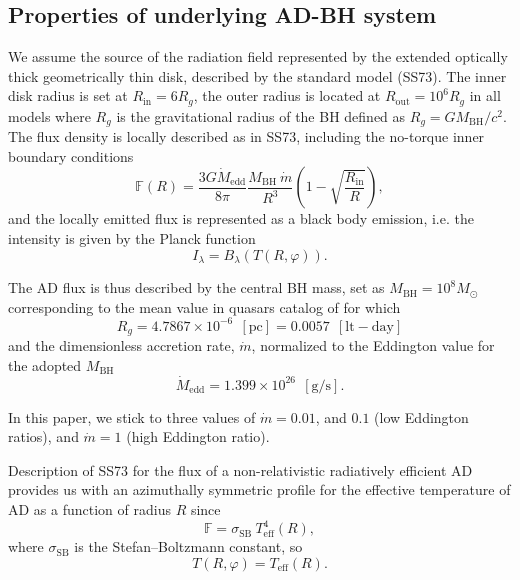 \documentclass[twocolumn]{aastex62}
\begin{document}
\subsection{Properties of underlying AD-BH system } \label{sec:diskproperties}

We assume the source of the radiation field represented by the extended optically thick geometrically thin disk, described by the \citet{SS1973} standard model (SS73). The inner disk radius is set at $R_{\mathrm{in}} = 6 R_{g}$, the outer radius is located at $R_{\mathrm{out}} = 10^6 R_{g}$ in all models where $R_{g}$ is the gravitational radius of the BH defined as $R_g = G M_{\mathrm{BH}}/c^2$. The flux density is locally described as in SS73, including the no-torque inner boundary conditions
\begin{equation}\label{diskflux}
\mathbb{F} (R) = \frac{3G \dot M_{\mathrm{edd}}}{8 \pi} \frac{M_{\mathrm{BH}}\ \dot{m}}{R^3}
\left( 1- \sqrt{\frac{R_{\mathrm{in}}}{R}} \right),
\end{equation}
and the locally emitted flux is represented as a black body emission, i.e. the intensity is given by the Planck function
\begin{equation}
 I_{\lambda} = B_{\lambda} \left( T (R, \varphi) \right).
\end{equation}

The AD flux is thus described by the central BH mass, set as $M_{\mathrm{BH}}=10^{8} M_{\odot}$ corresponding to the mean value in quasars catalog of \citet{Shen2011} for which
\begin{equation}
R_{g} = 4.7867 \times 10^{-6} ~~ \mathrm{[pc]}
= 0.0057 ~~ \mathrm{[lt-day]}
\end{equation}
and the dimensionless accretion rate, $\dot m$, normalized to the Eddington value for the adopted $M_{\mathrm{BH}}$
\begin{equation}
\dot M_{\mathrm{edd}}= 1.399 \times 10^{26} ~~ \mathrm{[g/s]}.
\end{equation}

In this paper, we stick to three values of $\dot m = 0.01$, and $0.1$ (low Eddington ratios), and $\dot m=1$ (high Eddington ratio).

Description of SS73 for the flux of a non-relativistic radiatively efficient AD provides us with an azimuthally symmetric profile for the effective temperature of AD as a function of radius $R$ since
\begin{equation}
\mathbb{F} = \sigma_{\mathrm{SB}}\ T_{\mathrm{eff}}^4(R),
\end{equation}
where $\sigma_{\mathrm{SB}}$ is the Stefan–Boltzmann constant, so
\begin{equation}
T(R, \varphi) = T_{\mathrm{eff}}(R). 
\end{equation}
\end{document}
